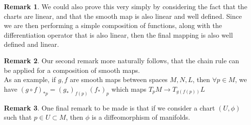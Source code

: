 \documentclass[12pt]{book}
\theoremstyle{definition}
\newtheorem*{remark}{Remark}
\begin{document}
\begin{remark}
    We could also prove this very simply by considering the fact that the charts are linear, and that the smooth map is also linear and well defined. Since we are then performing a simple composition of functions, along with the differentiation operator that is also linear, then the final mapping is also well defined and linear.
\end{remark}
\begin{remark}
    Our second remark more naturally follows, that the chain rule can be applied for a composition of smooth maps. \\ As an example, if $g, f$ are smooth maps between spaces $M, N, L$, then $\forall p \in M$, we have $(g \circ f)_{*p} = (g_*)_{f(p)}(f_*)_p$ which maps $T_pM \to T_{g(f(p))}L$
\end{remark}
\begin{remark}
    One final remark to be made is that if we consider a chart $(U, \phi)$ such that $p \in U \subset M$, then $\phi$ is a diffeomorphism of manifolds.
\end{remark}
\end{document}
